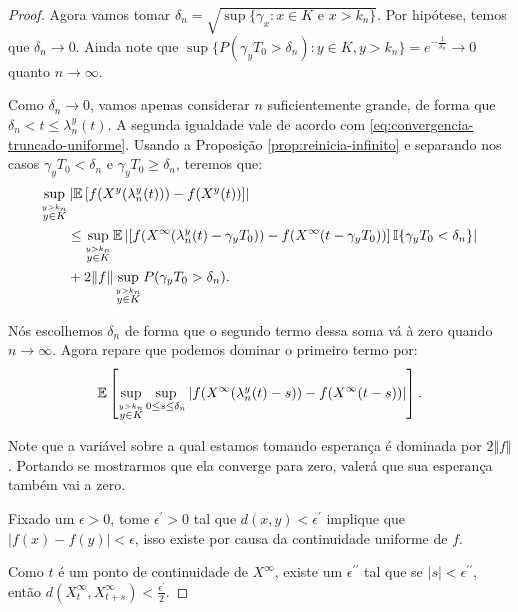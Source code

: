 \begin{proof}
  Agora vamos tomar $\delta_n = \sqrt{\sup\{ \gamma_x: x \in K
    \textrm{ e } x > k_n\}}$. Por hipótese, temos que $\delta_n \to
  0$. Ainda note que $\sup \{ P(\gamma_y T_0 > \delta_n) : y \in K, y
  > k_n \} = e^{-\frac{1}{\delta_n}} \to 0$ quanto $n \to \infty$.

  Como $\delta_n \to 0$, vamos apenas considerar $n$ suficientemente
  grande, de forma que $\delta_n < t \leq \lambda_n^y(t)$. A segunda
  igualdade vale de acordo com
  \eqref{eq:convergencia-truncado-uniforme}. Usando a Proposição
  \ref{prop:reinicia-infinito} e separando nos casos $\gamma_yT_0 <
  \delta_n$ e $\gamma_yT_0 \geq \delta_n$, teremos que:
  \begin{align}
    \label{eq:markov-quase-la}
    \sup_{\stackrel{y > k_n}{y \in K}}& \left\lvert {\mathbb{E}} \left[f(X^y(\lambda_n^y(t))) -
        f(X^y(t)) \right]
    \right\rvert \notag \\
    &\leq \sup_{\stackrel{y > k_n}{y \in K}} {\mathbb{E}} \left\lvert
      \left[f(X^\infty(\lambda_n^y(t)-\gamma_yT_0)) -
        f(X^\infty(t-\gamma_yT_0)) \right] {\mathbb{I}}\{ \gamma_yT_0 <
      \delta_n \}
    \right\rvert\\
    &+ 2 \Vert f \Vert \sup_{\stackrel{y > k_n}{y \in K}} P(\gamma_y T_0 > \delta_n).
    \notag
  \end{align}

  Nós escolhemos $\delta_n$ de forma que o segundo termo dessa soma vá
  à zero quando $n \to \infty$. Agora repare que podemos dominar o
  primeiro termo por:
  \begin{displaymath}
     {\mathbb{E}} \left[ \sup_{\stackrel{y > k_n}{y\in K}}
      \sup_{0 \leq s \leq \delta_n} \left\lvert
        f(X^\infty(\lambda_n^y(t)-s)) -
        f(X^\infty(t-s))
    \right\rvert \right].
  \end{displaymath}

  Note que a variável sobre a qual estamos tomando esperança é
  dominada por $2\Vert f \Vert$. Portando se mostrarmos que ela
  converge \qc para zero, valerá que sua esperança também vai a zero.

  Fixado um $\epsilon > 0$, tome $\epsilon^\prime > 0$ tal que $d(x, y) <
  \epsilon^\prime$ implique que $|f(x) - f(y)| < \epsilon$, isso
  existe por causa da continuidade uniforme de $f$.
 
  Como $t$ é \qc um ponto de continuidade de $X^\infty$, existe um
  $\epsilon^{\prime\prime}$ tal que se $|s| <
  \epsilon^{\prime\prime}$, então $d(X^\infty_t, X^\infty_{t+s}) <
  \frac{\epsilon^{\prime}}{2}$.


\end{proof}
